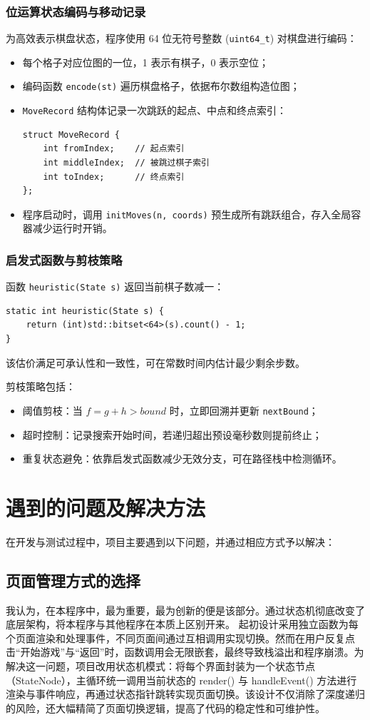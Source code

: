 \documentclass[12pt, a4paper]{article}
\begin{document}
\subsubsection{位运算状态编码与移动记录}
为高效表示棋盘状态，程序使用 64 位无符号整数 (\texttt{uint64\_t}) 对棋盘进行编码：
\begin{itemize}
  \item 每个格子对应位图的一位，1 表示有棋子，0 表示空位；
  \item 编码函数 \texttt{encode(st)} 遍历棋盘格子，依据布尔数组构造位图；
  \item \texttt{MoveRecord} 结构体记录一次跳跃的起点、中点和终点索引：
  \begin{verbatim}
struct MoveRecord {
    int fromIndex;    // 起点索引
    int middleIndex;  // 被跳过棋子索引
    int toIndex;      // 终点索引
};
  \end{verbatim}
  \item 程序启动时，调用 \texttt{initMoves(n, coords)} 预生成所有跳跃组合，存入全局容器减少运行时开销。
\end{itemize}

\subsubsection{启发式函数与剪枝策略}
函数 \texttt{heuristic(State s)} 返回当前棋子数减一：
\begin{verbatim}
static int heuristic(State s) {
    return (int)std::bitset<64>(s).count() - 1;
}
\end{verbatim}
该估价满足可承认性和一致性，可在常数时间内估计最少剩余步数。

剪枝策略包括：
\begin{itemize}
  \item 阈值剪枝：当 $f=g+h>bound$ 时，立即回溯并更新 \texttt{nextBound}；
  \item 超时控制：记录搜索开始时间，若递归超出预设毫秒数则提前终止；
  \item 重复状态避免：依靠启发式函数减少无效分支，可在路径栈中检测循环。
\end{itemize}

\section{遇到的问题及解决方法}
在开发与测试过程中，项目主要遇到以下问题，并通过相应方式予以解决：
\subsection{页面管理方式的选择}
我认为，在本程序中，最为重要，最为创新的便是该部分。通过状态机彻底改变了底层架构，将本程序与其他程序在本质上区别开来。
起初设计采用独立函数为每个页面渲染和处理事件，不同页面间通过互相调用实现切换。然而在用户反复点击“开始游戏”与“返回”时，函数调用会无限嵌套，最终导致栈溢出和程序崩溃。为解决这一问题，项目改用状态机模式：将每个界面封装为一个状态节点（StateNode），主循环统一调用当前状态的 render() 与 handleEvent() 方法进行渲染与事件响应，再通过状态指针跳转实现页面切换。该设计不仅消除了深度递归的风险，还大幅精简了页面切换逻辑，提高了代码的稳定性和可维护性。
\end{document}
